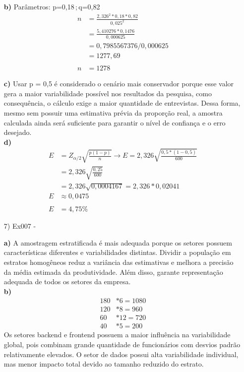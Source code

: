 \documentclass[fleqn, 12pt]{article}
\begin{document}
\begin{itemize}
\textbf{b)}
Parâmetros: p=0,18\,;\,q=0,82\\
\begin{align*}
    n&=\frac{2,326^2*0,18*0,82}{0,025^2}\\
    &=\frac{5,410276*0,1476}{0,000625}\\
    &=0,7985567376/0,000625\\
    &=1277,69\\\\
    n&=1278
\end{align*}

\textbf{c)}
Usar p = 0,5 é considerado o cenário mais conservador porque esse valor gera a maior variabilidade possível nos resultados da pesquisa, como consequência, o cálculo exige a maior quantidade de entrevistas. Dessa forma, mesmo sem possuir uma estimativa prévia da proporção real, a amostra calculada ainda será suficiente para garantir o nível de confiança e o erro desejado.\\

\textbf{d)}
\begin{align*}
    E&=Z_{\alpha/2}\sqrt{\frac{p(1-p)}{n}} \rightarrow E = 2,326\sqrt{\frac{0,5*(1-0,5)}{600}}\\
    &=2,326\sqrt{\frac{0,25}{600}}\\
    &=2,326\sqrt{0,0004167} = 2,326*0,02041\\
    E&\approx0,0475\\\\
    E&=4,75\%
\end{align*}
\newpage
\item[7)] Ex007 -

\textbf{a)}
A amostragem estratificada é mais adequada porque os setores possuem características diferentes e variabilidades distintas. Dividir a população em estratos homogêneos reduz a variância das estimativas e melhora a precisão da média estimada da produtividade. Além disso, garante representação adequada de todos os setores da empresa.\\

\textbf{b)}
\begin{align*}
    180&*6=1080\\
    120&*8=960\\
    60&*12=720\\
    40&*5=200
\end{align*}
Os setores backend e frontend possuem a maior influência na variabilidade global, pois combinam grande quantidade de funcionários com desvios padrão relativamente elevados. O setor de dados possui alta variabilidade individual, mas menor impacto total devido ao tamanho reduzido do estrato.\\


\end{itemize}
\end{document}
